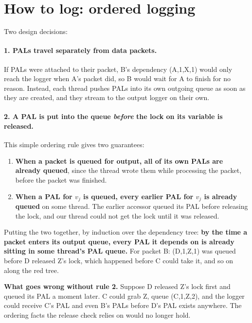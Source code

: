 \section{How to log: ordered logging}\label{sec:ftmbordered}

Two design decisions:

\paragraph{1. PALs travel separately from data packets.} If PALs were attached to their packet, B's dependency (A,1,X,1) would
only reach the logger when A's packet did, so B would wait for A to finish for no reason. Instead, each thread pushes PALs into
its own outgoing queue as soon as they are created, and they stream to the output logger on their own.

\paragraph{2. A PAL is put into the queue \emph{before} the lock on its variable is released.} This simple ordering rule gives
two guarantees:
\begin{enumerate}[label=(\roman*)]
  \item \textbf{When a packet is queued for output, all of its own PALs are already queued}, since the thread wrote them while
        processing the packet, before the packet was finished.
  \item \textbf{When a PAL for $v_j$ is queued, every earlier PAL for $v_j$ is already queued} on some thread. The earlier accessor
        queued its PAL before releasing the lock, and our thread could not get the lock until it was released.
\end{enumerate}
Putting the two together, by induction over the dependency tree: \textbf{by the time a packet enters its output queue, every PAL it
depends on is already sitting in some thread's PAL queue.} For packet B: (D,1,Z,1) was queued before D released Z's lock, which
happened before C could take it, and so on along the red tree.

\textbf{What goes wrong without rule 2.} Suppose D released Z's lock first and queued its PAL a moment later. C could grab Z,
queue (C,1,Z,2), and the logger could receive C's PAL and even B's PALs before D's PAL exists anywhere. The ordering facts the
release check relies on would no longer hold.

